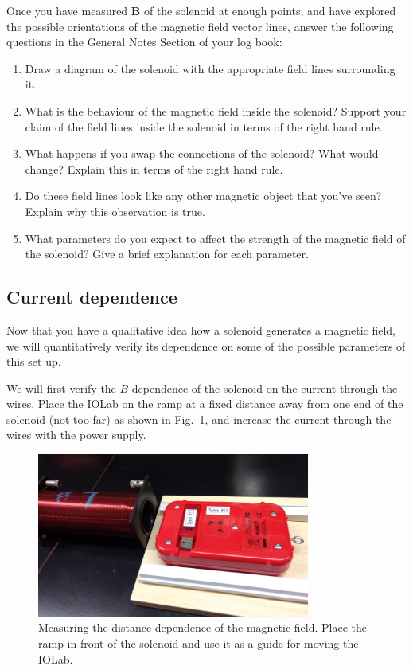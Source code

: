 \documentclass[12pt]{report}
\begin{document}
Once you have measured $\mathbf{B}$ of the solenoid at enough points, and have explored the possible orientations of the magnetic field vector lines, {\color{blue}answer the following questions in the General Notes Section of your log book:}
\begin{enumerate}
\item Draw a diagram of the solenoid with the appropriate field lines surrounding it.

\item What is the behaviour of the magnetic field inside the solenoid? Support your claim of the field lines inside the solenoid in terms of the right hand rule.
\item What happens if you swap the connections of the solenoid? What would change? Explain this in terms of the right hand rule.
\item Do these field lines look like any other magnetic object that you've seen? Explain why this observation is true.

\item What parameters do you expect to affect the strength of the magnetic field of the solenoid? Give a brief explanation for each parameter.

\end{enumerate}

\subsection{Current dependence}
Now that you have a qualitative idea how a solenoid generates a magnetic field, we will quantitatively verify its dependence on some of the possible parameters of this set up.

We will first verify the $B$ dependence of the solenoid on the current through the wires. Place the IOLab on the ramp at a fixed distance away from one end of the solenoid (not too far) as shown in Fig.~\ref{Fig:lab3-sessiona-ramp}, and increase the current through the wires with the power supply. 

\begin{figure}[h]
\centering
\includegraphics[width=0.8\textwidth]{lab3-sessiona-ramp}
\caption{Measuring the distance dependence of the magnetic field. Place the ramp in front of the solenoid and use it as a guide for moving the IOLab.}
\label{Fig:lab3-sessiona-ramp}
\end{figure}
\end{document}
